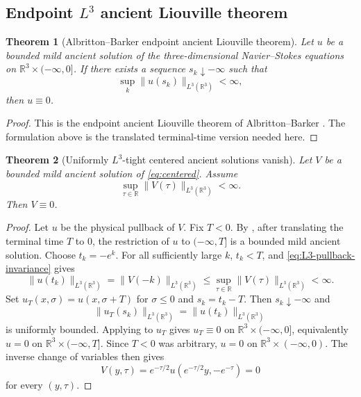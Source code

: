 \documentclass[11pt]{amsart}
\theoremstyle{plain}
\newtheorem{theorem}{Theorem}[section]
\theoremstyle{definition}
\theoremstyle{remark}
\numberwithin{equation}{section}
\newcommand{\R}{\mathbb R}
\begin{document}
\subsection{\texorpdfstring{Endpoint \(L^3\) ancient Liouville theorem}{Endpoint L3 ancient Liouville theorem}}

\begin{theorem}[Albritton--Barker endpoint ancient Liouville theorem]
\label{thm:AB-endpoint}
Let \(u\) be a bounded mild ancient solution of the three-dimensional
Navier--Stokes equations on \(\R^3\times(-\infty,0]\).  If there exists a
sequence \(s_k\downarrow-\infty\) such that
\[
   \sup_k\|u(s_k)\|_{L^3(\R^3)}<\infty,
\]
then \(u\equiv0\).
\end{theorem}

\begin{proof}
This is the endpoint ancient Liouville theorem of Albritton--Barker
\cite{AlbrittonBarker2019}.  The formulation above is the translated
terminal-time version needed here.
\end{proof}

\begin{theorem}[Uniformly \(L^3\)-tight centered ancient solutions vanish]
\label{thm:tight-liouville}
Let \(V\) be a bounded mild ancient solution of \eqref{eq:centered}.  Assume
\[
   \sup_{\tau\in\R}\|V(\tau)\|_{L^3(\R^3)}<\infty .
\]
Then \(V\equiv0\).
\end{theorem}

\begin{proof}
Let \(u\) be the physical pullback of \(V\).  Fix \(T<0\).  By
, after translating the terminal time \(T\) to \(0\),
the restriction of \(u\) to \((-\infty,T]\) is a bounded mild ancient
solution.  Choose \(t_k=-e^k\).  For all sufficiently large \(k\), \(t_k<T\),
and \eqref{eq:L3-pullback-invariance} gives
\[
   \|u(t_k)\|_{L^3(\R^3)}
   =
   \|V(-k)\|_{L^3(\R^3)}
   \le
   \sup_{\tau\in\R}\|V(\tau)\|_{L^3(\R^3)}
   <\infty .
\]
Set \(u_T(x,\sigma)=u(x,\sigma+T)\) for \(\sigma\le0\) and
\(s_k=t_k-T\).  Then \(s_k\downarrow-\infty\) and
\[
   \|u_T(s_k)\|_{L^3(\R^3)}
   =
   \|u(t_k)\|_{L^3(\R^3)}
\]
is uniformly bounded.  Applying  to \(u_T\) gives
\(u_T\equiv0\) on \(\R^3\times(-\infty,0]\), equivalently \(u=0\) on
\(\R^3\times(-\infty,T]\).  Since \(T<0\) was arbitrary, \(u=0\) on
\(\R^3\times(-\infty,0)\).  The inverse change of variables then gives
\[
   V(y,\tau)=e^{-\tau/2}u(e^{-\tau/2}y,-e^{-\tau})=0
\]
for every \((y,\tau)\).
\end{proof}
\end{document}
